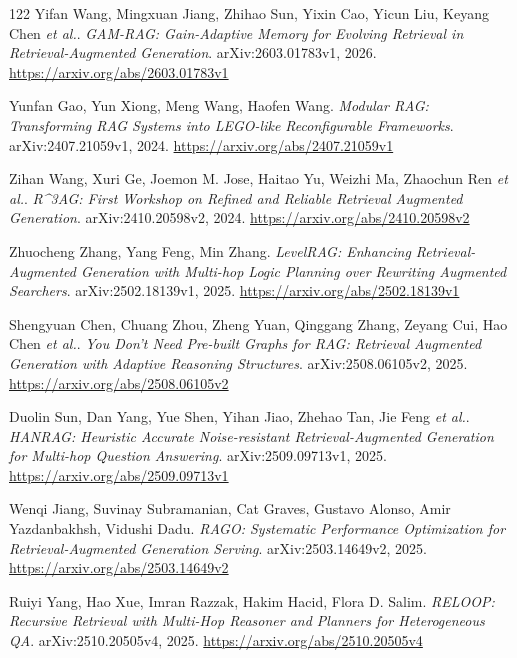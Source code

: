 \documentclass[11pt,a4paper]{article}
\begin{document}
\begin{thebibliography}{122}
Yifan Wang, Mingxuan Jiang, Zhihao Sun, Yixin Cao, Yicun Liu, Keyang Chen \emph{et al.}.
\newblock \emph{GAM-RAG: Gain-Adaptive Memory for Evolving Retrieval in Retrieval-Augmented Generation}.
\newblock arXiv:2603.01783v1, 2026.
\newblock \url{https://arxiv.org/abs/2603.01783v1}

Yunfan Gao, Yun Xiong, Meng Wang, Haofen Wang.
\newblock \emph{Modular RAG: Transforming RAG Systems into LEGO-like Reconfigurable Frameworks}.
\newblock arXiv:2407.21059v1, 2024.
\newblock \url{https://arxiv.org/abs/2407.21059v1}

Zihan Wang, Xuri Ge, Joemon M. Jose, Haitao Yu, Weizhi Ma, Zhaochun Ren \emph{et al.}.
\newblock \emph{R\textasciicircum{}3AG: First Workshop on Refined and Reliable Retrieval Augmented Generation}.
\newblock arXiv:2410.20598v2, 2024.
\newblock \url{https://arxiv.org/abs/2410.20598v2}

Zhuocheng Zhang, Yang Feng, Min Zhang.
\newblock \emph{LevelRAG: Enhancing Retrieval-Augmented Generation with Multi-hop Logic Planning over Rewriting Augmented Searchers}.
\newblock arXiv:2502.18139v1, 2025.
\newblock \url{https://arxiv.org/abs/2502.18139v1}

Shengyuan Chen, Chuang Zhou, Zheng Yuan, Qinggang Zhang, Zeyang Cui, Hao Chen \emph{et al.}.
\newblock \emph{You Don't Need Pre-built Graphs for RAG: Retrieval Augmented Generation with Adaptive Reasoning Structures}.
\newblock arXiv:2508.06105v2, 2025.
\newblock \url{https://arxiv.org/abs/2508.06105v2}

Duolin Sun, Dan Yang, Yue Shen, Yihan Jiao, Zhehao Tan, Jie Feng \emph{et al.}.
\newblock \emph{HANRAG: Heuristic Accurate Noise-resistant Retrieval-Augmented Generation for Multi-hop Question Answering}.
\newblock arXiv:2509.09713v1, 2025.
\newblock \url{https://arxiv.org/abs/2509.09713v1}

Wenqi Jiang, Suvinay Subramanian, Cat Graves, Gustavo Alonso, Amir Yazdanbakhsh, Vidushi Dadu.
\newblock \emph{RAGO: Systematic Performance Optimization for Retrieval-Augmented Generation Serving}.
\newblock arXiv:2503.14649v2, 2025.
\newblock \url{https://arxiv.org/abs/2503.14649v2}

Ruiyi Yang, Hao Xue, Imran Razzak, Hakim Hacid, Flora D. Salim.
\newblock \emph{RELOOP: Recursive Retrieval with Multi-Hop Reasoner and Planners for Heterogeneous QA}.
\newblock arXiv:2510.20505v4, 2025.
\newblock \url{https://arxiv.org/abs/2510.20505v4}


\end{thebibliography}
\end{document}

